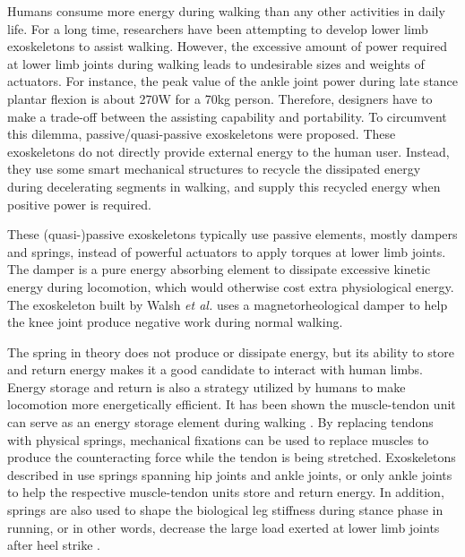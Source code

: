 \documentclass[10pt]{asme2ej}
\begin{document}
Humans consume more energy during walking than any other activities in daily life.
For a long time, researchers have been attempting to develop lower limb exoskeletons to assist walking.
However, the excessive amount of power required at lower limb joints during walking leads to undesirable sizes and weights of actuators\cite{RN1}.
For instance, the peak value of the ankle joint power during late stance plantar flexion is about 270W for a 70kg person\cite{RN2}.
Therefore, designers have to make a trade-off between the assisting capability and portability.
To circumvent this dilemma, passive/quasi-passive exoskeletons were proposed\cite{RN3}.
These exoskeletons do not directly provide external energy to the human user.
Instead, they use some smart mechanical structures to recycle the dissipated energy during decelerating segments in walking, and supply this recycled energy when positive power is required.

These (quasi-)passive exoskeletons typically use passive elements, mostly dampers and springs, instead of powerful actuators to apply torques at lower limb joints.
The damper is a pure energy absorbing element to dissipate excessive kinetic energy during locomotion, which would otherwise cost extra physiological energy\cite{negativework}.
The exoskeleton built by Walsh \emph{et al.} uses a magnetorheological damper to help the knee joint produce negative work during normal walking\cite{RN3}.

The spring in theory does not produce or dissipate energy, but its ability to store and return energy makes it a good candidate to interact with human limbs. 
Energy storage and return is also a strategy utilized by humans to make locomotion more energetically efficient.
It has been shown the muscle-tendon unit can serve as an energy storage element during walking \cite{RN16,pays}.
By replacing tendons with physical springs, mechanical fixations can be used to replace muscles to produce the counteracting force while the tendon is being stretched.
Exoskeletons described in \cite{RN3,RN4,RN5} use springs spanning hip joints and ankle joints, or only ankle joints to help the respective muscle-tendon units store and return energy.
In addition, springs are also used to shape the biological leg stiffness during stance phase in running, or in other words, decrease the large load exerted at lower limb joints after heel strike \cite{RN6,RN7,RN8}.
\end{document}
